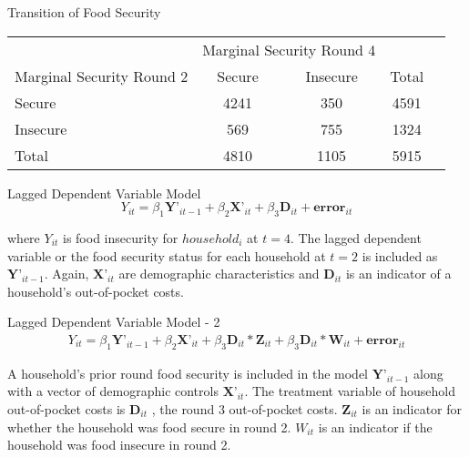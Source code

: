 \documentclass[t, hyperref={colorlinks=true}, compress]{beamer}
\begin{document}
\begin{frame}{Transition of Food Security}
\begin{table}[!htbp]
\begin{tabular}{l cccc}
 & \multicolumn{2}{c}{Marginal Security Round 4} \\
Marginal Security Round 2 & Secure & Insecure & Total \\
\hline
Secure &4241&350&4591 \\
Insecure &569&755&1324\\
\hline
Total&4810&1105&5915\\
\hline

\end{tabular}
\end{table}
\end{frame}











\begin{frame}{Lagged Dependent Variable Model}
\begin{equation} \label{FS_lagged}
Y_{it} = \beta_{1}\textbf{Y'}_{it-1}  +  \beta_{2}\textbf{X'}_{it} +  \beta_{3}\textbf{D}_{it}  +  \textbf{error}_{it} 
\end{equation}
\bigskip
\bigskip

where $Y_{it}$ is food insecurity for $household_{i}$ at $t=4$. The lagged dependent variable or the food security status for each household at $t=2$ is included as $\textbf{Y'}_{it-1}$.  Again, $\textbf{X'}_{it}$ are demographic characteristics and $\textbf{D}_{it}$ is an indicator of a household's out-of-pocket costs.
\end{frame}


\begin{frame}{Lagged Dependent Variable Model - 2}
\begin{multline} \label{FS_lagged2}
Y_{it} = \beta_{1}\textbf{Y'}_{it-1}  +  \beta_{2}\textbf{X'}_{it} +  \beta_{3}\textbf{D}_{it}*\textbf{Z}_{it} +\beta_{3}\textbf{D}_{it}*\textbf{W}_{it} +  \textbf{error}_{it} 
\end{multline}

A household’s prior round food security is included in the model $\textbf{Y'}_{it-1} $ along with a vector of demographic controls  $\textbf{X'}_{it} $. The treatment variable of household out-of-pocket costs is  $\textbf{D}_{it}$ , the round 3 out-of-pocket costs. $ \textbf{Z}_{it}$ is an indicator for whether the household was food secure in round 2.   $W_{it} $ is an indicator if the household was food insecure in round 2. 
\end{frame}
\end{document}

